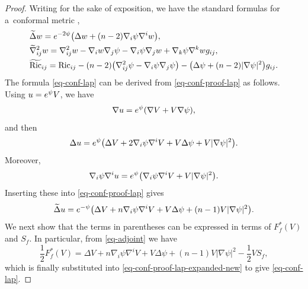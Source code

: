 \documentclass[10pt,a4paper]{amsart}
\begin{document}
\begin{proof}
	Writing  for the sake of exposition, we have the standard formulas for a~conformal metric ,
	\begin{align}
		&\widetilde\Delta w
={\rm e}^{-2\psi}\bigl(\Delta w+(n-2) \nabla_i\psi \nabla^i w\bigr), \label{eq-conf-proof-lap}\\
&		\widetilde\nabla^2_{ij} w
=\nabla_{ij}^2 w-\nabla_iw \nabla_j\psi-\nabla_i\psi \nabla_jw+\nabla_k\psi \nabla^k w g_{ij}, \label{eq-conf-proof-hess}\\
& \widetilde{\mathrm{Ric}}_{ij}
=\mathrm{Ric}_{ij}-(n-2)\big(\nabla_{ij}^2\psi-\nabla_i\psi \nabla_j\psi\big)
-\big(\Delta\psi+(n-2)|\nabla\psi|^2\big)g_{ij}. \label{eq-conf-proof-ric}
	\end{align}
	The formula \eqref{eq-conf-lap} can be derived from \eqref{eq-conf-proof-lap} as follows. Using $u={\rm e}^{\psi}V$, we have
	\[
	\nabla u={\rm e}^{\psi}(\nabla V+V\nabla\psi),
	\]
	and then
	\[
	\Delta u
	={\rm e}^{\psi}\bigl(\Delta V+2\nabla_i\psi \nabla^i V+V\Delta\psi+V|\nabla\psi|^2\bigr).
	\]
	Moreover,
	\[
	\nabla_i\psi \nabla^i u
	={\rm e}^{\psi}\bigl(\nabla_i\psi \nabla^i V+V|\nabla\psi|^2\bigr).
	\]
	Inserting these into \eqref{eq-conf-proof-lap} gives
	\begin{equation}\label{eq-conf-proof-lap-expanded-new}
		\widetilde\Delta u
		={\rm e}^{-\psi}\bigl(\Delta V+n\nabla_i\psi \nabla^i V+V\Delta\psi+(n-1)V|\nabla\psi|^2\bigr).
	\end{equation}
	We next show that the terms in parentheses can be expressed in terms of $F_f^*(V)$ and $S_f$. In particular, from \eqref{eq-adjoint} we have
	\[
	\frac12 F_f^*(V)
	=\Delta V+n\nabla_i\psi \nabla^i V+V\Delta\psi+(n-1)V|\nabla\psi|^2-\frac12 V S_f,
	\]
	which is finally substituted into \eqref{eq-conf-proof-lap-expanded-new} to give \eqref{eq-conf-lap}.
	

\end{proof}
\end{document}
